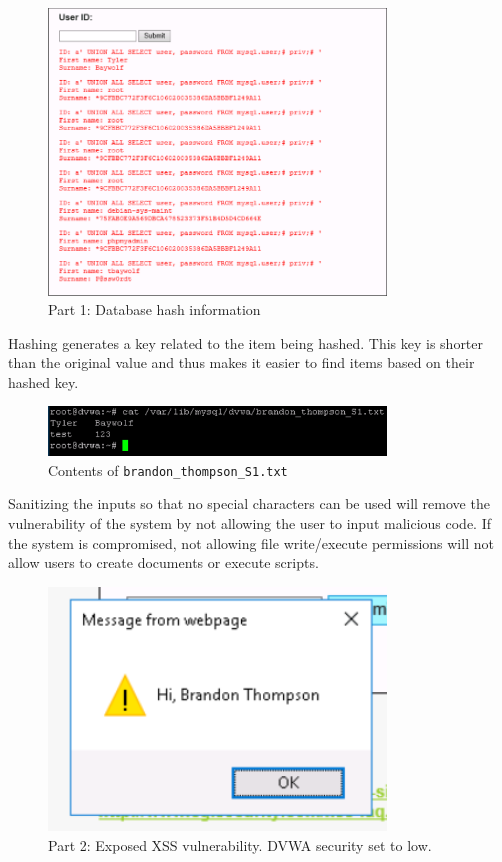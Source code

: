 \documentclass[a4paper]{article}
\begin{document}
	\begin{figure}[ht!]
		\centering
		\includegraphics[width=0.8\textwidth]{1_3_21}
		\caption{Part 1: Database hash information}
		\label{fig:1_3_21}
	\end{figure}
	
	Hashing generates a key related to the item being hashed. This key is shorter
	than the original value and thus makes it easier to find items based on their
	hashed key.\\

	\begin{figure}[ht!]
		\centering
		\includegraphics[width=0.8\textwidth]{1_4_3}
		\caption{Contents of \texttt{brandon\_thompson\_S1.txt}}
		\label{fig:1_4_3}
	\end{figure}

	Sanitizing the inputs so that no special characters can be used will remove the
	vulnerability of the system by not allowing the user to input malicious code.
	If the system is compromised, not allowing file write/execute permissions will
	not allow users to create documents or execute scripts.
	\clearpage
	\begin{figure}[ht!]
		\centering
		\includegraphics[width=0.8\textwidth]{2_2_5}
		\caption{Part 2: Exposed XSS vulnerability. DVWA security set to low.}
		\label{fig:2_2_5}
	\end{figure}
\end{document}
